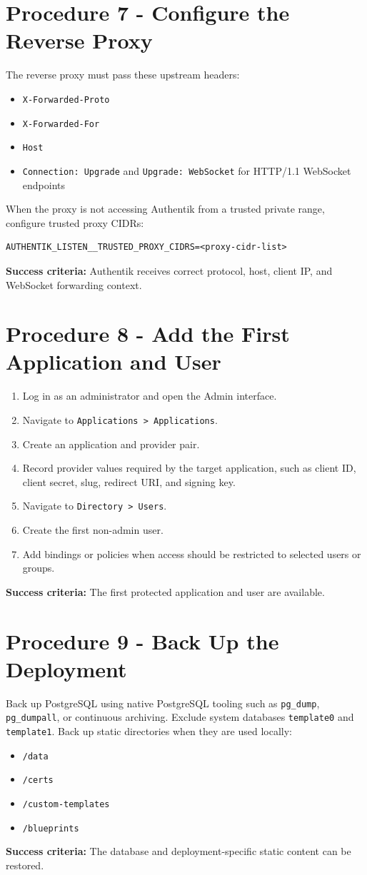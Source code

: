 \documentclass[11pt]{article}
\newcommand{\ok}{\textbf{Success criteria:} }
\begin{document}
\section*{Procedure 7 - Configure the Reverse Proxy}
The reverse proxy must pass these upstream headers:
\begin{itemize}
\item \texttt{X-Forwarded-Proto}
\item \texttt{X-Forwarded-For}
\item \texttt{Host}
\item \texttt{Connection: Upgrade} and \texttt{Upgrade: WebSocket} for HTTP/1.1 WebSocket endpoints
\end{itemize}
When the proxy is not accessing Authentik from a trusted private range, configure trusted proxy CIDRs:
\begin{verbatim}
AUTHENTIK_LISTEN__TRUSTED_PROXY_CIDRS=<proxy-cidr-list>
\end{verbatim}
\ok Authentik receives correct protocol, host, client IP, and WebSocket forwarding context.

\section*{Procedure 8 - Add the First Application and User}
\begin{enumerate}
\item Log in as an administrator and open the Admin interface.
\item Navigate to \texttt{Applications > Applications}.
\item Create an application and provider pair.
\item Record provider values required by the target application, such as client ID, client secret, slug, redirect URI, and signing key.
\item Navigate to \texttt{Directory > Users}.
\item Create the first non-admin user.
\item Add bindings or policies when access should be restricted to selected users or groups.
\end{enumerate}
\ok The first protected application and user are available.

\section*{Procedure 9 - Back Up the Deployment}
Back up PostgreSQL using native PostgreSQL tooling such as \texttt{pg\_dump}, \texttt{pg\_dumpall}, or continuous archiving. Exclude system databases \texttt{template0} and \texttt{template1}. Back up static directories when they are used locally:
\begin{itemize}
\item \texttt{/data}
\item \texttt{/certs}
\item \texttt{/custom-templates}
\item \texttt{/blueprints}
\end{itemize}
\ok The database and deployment-specific static content can be restored.
\end{document}
